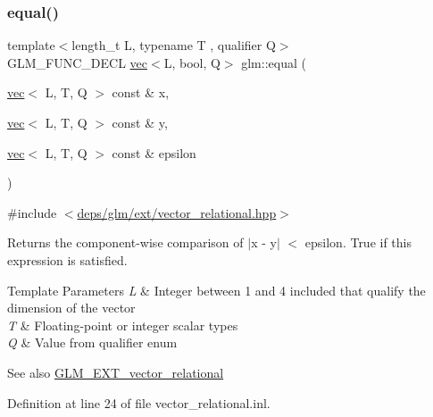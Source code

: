 \subsubsection{\texorpdfstring{equal()}{equal()}\hspace{0.1cm}{\footnotesize\ttfamily [2/3]}}
{\footnotesize\ttfamily template$<$length\+\_\+t L, typename T , qualifier Q$>$ \\
G\+L\+M\+\_\+\+F\+U\+N\+C\+\_\+\+D\+E\+CL \hyperlink{structglm_1_1vec}{vec}$<$L, bool, Q$>$ glm\+::equal (\begin{DoxyParamCaption}\item[{\hyperlink{structglm_1_1vec}{vec}$<$ L, T, Q $>$ const \&}]{x,  }\item[{\hyperlink{structglm_1_1vec}{vec}$<$ L, T, Q $>$ const \&}]{y,  }\item[{\hyperlink{structglm_1_1vec}{vec}$<$ L, T, Q $>$ const \&}]{epsilon }\end{DoxyParamCaption})}



{\ttfamily \#include $<$\hyperlink{ext_2vector__relational_8hpp}{deps/glm/ext/vector\+\_\+relational.\+hpp}$>$}

Returns the component-\/wise comparison of $\vert$x -\/ y$\vert$ $<$ epsilon. True if this expression is satisfied.


\begin{DoxyTemplParams}{Template Parameters}
{\em L} & Integer between 1 and 4 included that qualify the dimension of the vector \\
\hline
{\em T} & Floating-\/point or integer scalar types \\
\hline
{\em Q} & Value from qualifier enum\\
\hline
\end{DoxyTemplParams}
\begin{DoxySeeAlso}{See also}
\hyperlink{group__ext__vector__relational}{G\+L\+M\+\_\+\+E\+X\+T\+\_\+vector\+\_\+relational} 
\end{DoxySeeAlso}


Definition at line 24 of file vector\+\_\+relational.\+inl.

\mbox{\label{group__ext__vector__relational_gac4ae021e79693174e4de6560d159b33a}} 
